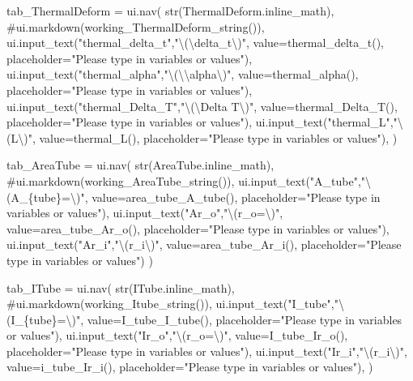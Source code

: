 \documentclass[
  letterpaper,
  DIV=11,
  numbers=noendperiod]{scrreprt}
\newenvironment{Shaded}{\begin{snugshade}}{\end{snugshade}}
\newcommand{\NormalTok}[1]{\textcolor[rgb]{0.00,0.23,0.31}{#1}}
\begin{document}
\begin{Shaded}
\begin{Highlighting}[]
\NormalTok{        tab\_ThermalDeform = ui.nav(}
\NormalTok{                str(ThermalDeform.inline\_math),}
\NormalTok{                \#ui.markdown(working\_ThermalDeform\_string()),}
\NormalTok{                ui.input\_text("thermal\_delta\_t","\textbackslash{}(\textbackslash{}delta\_t\textbackslash{})", value=thermal\_delta\_t(), placeholder="Please type in variables or values"),}
\NormalTok{                ui.input\_text("thermal\_alpha","\textbackslash{}(\textbackslash{}\textbackslash{}alpha\textbackslash{})", value=thermal\_alpha(), placeholder="Please type in variables or values"),}
\NormalTok{                ui.input\_text("thermal\_Delta\_T","\textbackslash{}(\textbackslash{}Delta T\textbackslash{})", value=thermal\_Delta\_T(), placeholder="Please type in variables or values"),}
\NormalTok{                ui.input\_text("thermal\_L","\textbackslash{}(L\textbackslash{})", value=thermal\_L(), placeholder="Please type in variables or values"),}
\NormalTok{                )}
        
\NormalTok{        tab\_AreaTube = ui.nav(}
\NormalTok{                str(AreaTube.inline\_math),}
\NormalTok{                \#ui.markdown(working\_AreaTube\_string()),}
\NormalTok{                ui.input\_text("A\_tube","\textbackslash{}(A\_\{tube\}=\textbackslash{})", value=area\_tube\_A\_tube(), placeholder="Please type in variables or values"),}
\NormalTok{                ui.input\_text("Ar\_o","\textbackslash{}(r\_o=\textbackslash{})", value=area\_tube\_Ar\_o(), placeholder="Please type in variables or values"),}
\NormalTok{                ui.input\_text("Ar\_i","\textbackslash{}(r\_i\textbackslash{})", value=area\_tube\_Ar\_i(), placeholder="Please type in variables or values")}
\NormalTok{                )}
        
\NormalTok{        tab\_ITube = ui.nav(}
\NormalTok{                str(ITube.inline\_math),}
\NormalTok{                \#ui.markdown(working\_Itube\_string()),}
\NormalTok{                ui.input\_text("I\_tube","\textbackslash{}(I\_\{tube\}=\textbackslash{})", value=I\_tube\_I\_tube(), placeholder="Please type in variables or values"),}
\NormalTok{                ui.input\_text("Ir\_o","\textbackslash{}(r\_o=\textbackslash{})", value=I\_tube\_Ir\_o(), placeholder="Please type in variables or values"),}
\NormalTok{                ui.input\_text("Ir\_i","\textbackslash{}(r\_i\textbackslash{})", value=i\_tube\_Ir\_i(), placeholder="Please type in variables or values"),}
\NormalTok{                )}
        

\end{Highlighting}
\end{Shaded}
\end{document}
